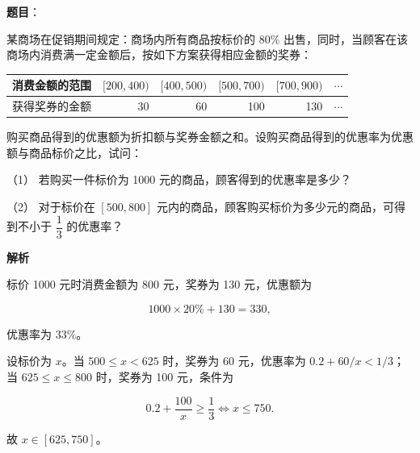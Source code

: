 \begin{answer}

\textbf{题目}：

某商场在促销期间规定：商场内所有商品按标价的 80\% 出售，同时，当顾客在该商场内消费满一定金额后，按如下方案获得相应金额的奖券：

\begin{center}
\begin{tabular}{lrrrrr}
\toprule
消费金额的范围 & $[200,400)$ & $[400,500)$ & $[500,700)$ & $[700,900)$ & $\cdots$ \\
\midrule
获得奖券的金额 & 30 & 60 & 100 & 130 & $\cdots$ \\
\bottomrule
\end{tabular}
\end{center}

购买商品得到的优惠额为折扣额与奖券金额之和。设购买商品得到的优惠率为优惠额与商品标价之比，试问：

（1） 若购买一件标价为 1000 元的商品，顾客得到的优惠率是多少？

（2） 对于标价在 $[500,800]$ 元内的商品，顾客购买标价为多少元的商品，可得到不小于 $\dfrac13$ 的优惠率？

\textbf{解析}


标价 1000 元时消费金额为 800 元，奖券为 130 元，优惠额为

\nopagebreak[4]
\[
1000\times20\%+130=330,
\]

优惠率为 $33\%$。


设标价为 $x$。当 $500\le x<625$ 时，奖券为 60 元，优惠率为 $0.2+60/x<1/3$；当 $625\le x\le800$ 时，奖券为 100 元，条件为

\nopagebreak[4]
\[
0.2+\frac{100}{x}\ge\frac13
\Longleftrightarrow x\le750.
\]

故 $x\in[625,750]$。



\end{answer}
